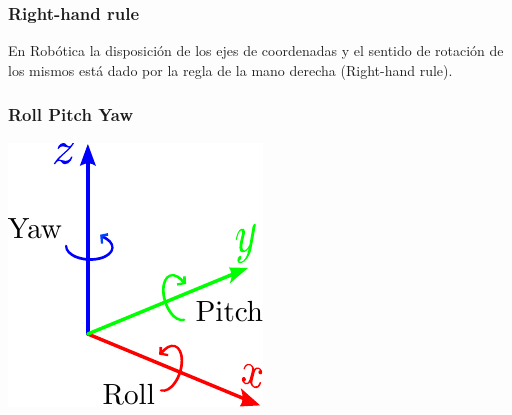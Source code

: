 \begin{frame}
    \frametitle{Right-hand rule}
    En Robótica la disposición de los ejes de coordenadas y el sentido de rotación de los mismos está dado por la regla de la mano derecha (Right-hand rule).

    \begin{figure}[!h]
        \centering
        \hfill
    \end{figure}
\end{frame}

\begin{frame}
    \frametitle{Roll Pitch Yaw }
    \includegraphics[width=0.5\columnwidth]{./images/roll_pitch_yaw.pdf}

\end{frame}

